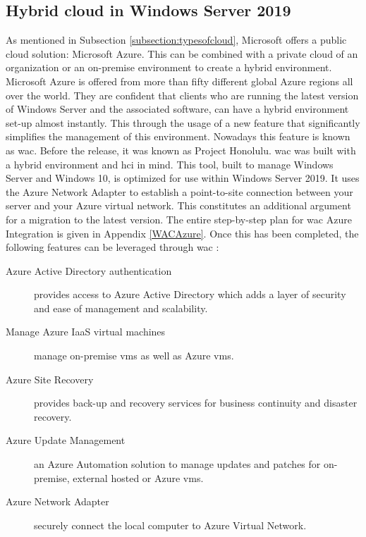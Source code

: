 \subsection{Hybrid cloud in Windows Server 2019}
\label{hybrid-cloud-windows-server-2019}
As mentioned in Subsection \ref{subsection:typesofcloud}, Microsoft offers a public cloud solution: Microsoft Azure. 
This can be combined with a private cloud of an organization or an on-premise environment to create a hybrid environment. 
Microsoft Azure is offered from more than fifty different global Azure regions all over the world. 
They are confident that clients who are running the latest version of Windows Server and the associated software, can have a hybrid environment set-up almost instantly. 
This through the usage of a new feature that significantly simplifies the management of this environment. 
Nowadays this feature is known as \acrfull{wac}. 
Before the release, it was known as Project Honolulu. 
\acrlong{wac} was built with a hybrid environment and \acrshort{hci} in mind. 
This tool, built to manage Windows Server and Windows 10, is optimized for use within Windows Server 2019. 
It uses the Azure Network Adapter to establish a point-to-site connection between your server and your Azure virtual network. 
This constitutes an additional argument for a migration to the latest version. 
The entire step-by-step plan for \acrlong{wac} Azure Integration is given in Appendix \ref{WACAzure}. 
Once this has been completed, the following features can be leveraged through \acrlong{wac} \autocite{Washburn2018}:

\begin{description}
\item [Azure Active Directory authentication] provides access to Azure Active Directory which adds a layer of security and ease of management and scalability.
\item [Manage Azure IaaS virtual machines] manage on-premise \acrshort{vm}s as well as Azure \acrshort{vm}s.
\item [Azure Site Recovery] provides back-up and recovery services for business continuity and disaster recovery.
\item [Azure Update Management] an Azure Automation solution to manage updates and patches for on-premise, external hosted or Azure \acrshort{vm}s.
\item [Azure Network Adapter] securely connect the local computer to Azure Virtual Network.
\end{description}


